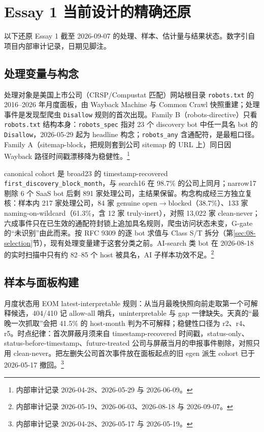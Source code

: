 \documentclass[a4paper,11pt]{ctexart}
\begin{document}
\section{Essay 1 当前设计的精确还原}\label{sec:02-essay1}

以下还原 Essay 1 截至 2026-09-07 的处理、样本、估计量与结果状态。数字引自项目内部审计记录，日期见脚注。

\subsection{处理变量与构念}\label{sec:02-treatment}

处理对象是美国上市公司（CRSP/Compustat 匹配）网站根目录 \texttt{robots.txt} 的 2016--2026 年月度面板，由 Wayback Machine 与 Common Crawl 快照重建；处理事件是发现型爬虫 \texttt{Disallow} 规则的首次出现。Family B（robots-directive）只看 \texttt{robots.txt} 结构本身：\texttt{robots\_spec} 指对 23 个 discovery bot 中任一具名 bot 的 \texttt{Disallow}，2026-05-29 起为 headline 构念；\texttt{robots\_any} 含通配符，是最粗口径。Family A（sitemap-block，把规则套到公司 sitemap 的 URL 上）同日因 Wayback 路径时间戳漂移降为稳健性。\footnote{内部审计记录 2026-04-28、2026-05-29 与 2026-06-09。}

canonical cohort 是 broad23 的 timestamp-recovered \texttt{first\_discovery\_block\_month}，与 search16 在 98.7\% 的公司上同月；narrow17 剔除 6 个 SaaS bot 后剩 891 家处理公司，主结果保留。构念构成经三方独立复核：样本内 217 家处理公司，84 家 genuine open$\to$blocked（38.7\%）、133 家 naming-on-wildcard（61.3\%，含 12 家 truly-inert），对照 13,022 家 clean-never；六成事件只在已生效的通配符封锁上追加具名规则，爬虫访问状态未变，G-gate 的“未识别”由此而来。按 RFC 9309 的逐 bot 求值与 Class S/T 拆分（第\ref{sec:08-selection}节），现有处理变量建于这套分类之前。AI-search 类 bot 在 2026-08-18 的实时扫描中只有约 82--85 个 host 被具名，AI 子样本功效不足。\footnote{内部审计记录 2026-05-19、2026-06-03、2026-08-18 与 2026-09-07。}

\subsection{样本与面板构建}\label{sec:02-sample}

月度状态用 EOM latest-interpretable 规则：从当月最晚快照向前走取第一个可解释候选，404/410 记 allow-all 哨兵，uninterpretable 与 gap 一律缺失。天真的“最晚一次抓取”会把 41.5\% 的 host-month 判为不可解释；稳健性口径为 r2、r4、r5。时点纪律：首次屏蔽月须来自 timestamp-recovered 时间戳，status-only、status-before-timestamp、future-treated 公司与屏蔽当月的申报事件剔除，对照只用 clean-never。把左删失公司首次事件放在面板起点的旧 egen 派生 cohort 已于 2026-05-17 撤回。\footnote{内部审计记录 2026-04-28、2026-05-17 与 2026-05-19。}
\end{document}
